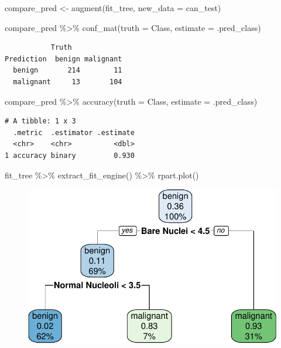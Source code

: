 \documentclass[
  letterpaper,
  DIV=11,
  numbers=noendperiod]{scrreprt}
\newenvironment{Shaded}{\begin{snugshade}}{\end{snugshade}}
\newcommand{\AttributeTok}[1]{\textcolor[rgb]{0.40,0.45,0.13}{#1}}
\newcommand{\FunctionTok}[1]{\textcolor[rgb]{0.28,0.35,0.67}{#1}}
\newcommand{\NormalTok}[1]{\textcolor[rgb]{0.00,0.23,0.31}{#1}}
\newcommand{\OtherTok}[1]{\textcolor[rgb]{0.00,0.23,0.31}{#1}}
\newcommand{\SpecialCharTok}[1]{\textcolor[rgb]{0.37,0.37,0.37}{#1}}
\begin{document}
\begin{Shaded}
\begin{Highlighting}[]
\NormalTok{compare\_pred }\OtherTok{\textless{}{-}} \FunctionTok{augment}\NormalTok{(fit\_tree, }\AttributeTok{new\_data =}\NormalTok{ can\_test) }

\NormalTok{compare\_pred }\SpecialCharTok{\%\textgreater{}\%} \FunctionTok{conf\_mat}\NormalTok{(}\AttributeTok{truth =}\NormalTok{ Class, }\AttributeTok{estimate =}\NormalTok{ .pred\_class)}
\end{Highlighting}
\end{Shaded}

\begin{verbatim}
           Truth
Prediction  benign malignant
  benign       214        11
  malignant     13       104
\end{verbatim}

\begin{Shaded}
\begin{Highlighting}[]
\NormalTok{compare\_pred }\SpecialCharTok{\%\textgreater{}\%}  \FunctionTok{accuracy}\NormalTok{(}\AttributeTok{truth =}\NormalTok{ Class, }\AttributeTok{estimate =}\NormalTok{ .pred\_class)}
\end{Highlighting}
\end{Shaded}

\begin{verbatim}
# A tibble: 1 x 3
  .metric  .estimator .estimate
  <chr>    <chr>          <dbl>
1 accuracy binary         0.930
\end{verbatim}

\begin{Shaded}
\begin{Highlighting}[]
\NormalTok{fit\_tree }\SpecialCharTok{\%\textgreater{}\%}
  \FunctionTok{extract\_fit\_engine}\NormalTok{() }\SpecialCharTok{\%\textgreater{}\%}
  \FunctionTok{rpart.plot}\NormalTok{()}
\end{Highlighting}
\end{Shaded}

\begin{figure}[H]

{\centering \includegraphics{./14-machine-learning_files/figure-pdf/unnamed-chunk-13-1.pdf}

}

\end{figure}
\end{document}
